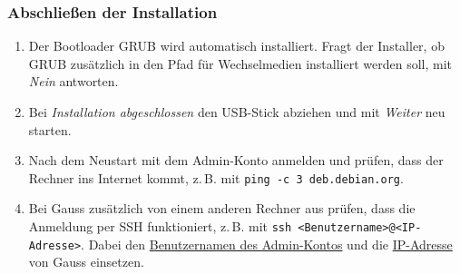 \subsubsection{Abschließen der Installation}
\label{grundsystem-installieren-abschliessen}
\begin{enumerate}
	\item Der Bootloader GRUB wird automatisch installiert. Fragt der Installer, ob GRUB zusätzlich in den Pfad für Wechselmedien installiert werden soll, mit \textit{Nein} antworten.
	\item Bei \textit{Installation abgeschlossen} den USB-Stick abziehen und mit \textit{Weiter} neu starten.
	\item Nach dem Neustart mit dem Admin-Konto anmelden und prüfen, dass der Rechner ins Internet kommt, z.\,B. mit \texttt{ping -c 3 deb.debian.org}.
	\item Bei Gauss zusätzlich von einem anderen Rechner aus prüfen, dass die Anmeldung per SSH funktioniert, z.\,B. mit \texttt{ssh <Benutzername>@<IP-Adresse>}. Dabei den \hyperref[gauss-benutzer]{Benutzernamen des Admin-Kontos} und die \hyperref[gauss-netzwerk]{IP-Adresse} von Gauss einsetzen.
\end{enumerate}
